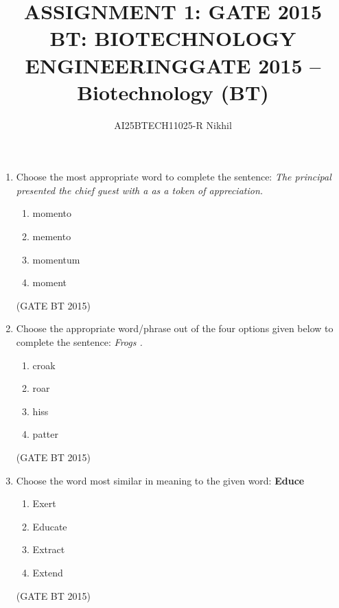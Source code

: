 \documentclass[journal,12pt,onecolumn]{IEEEtran}
\begin{document}
\title{
ASSIGNMENT 1: GATE 2015 \\
BT: BIOTECHNOLOGY ENGINEERING}
\author{AI25BTECH11025-R Nikhil}
\maketitle
\renewcommand{\thefigure}{\theenumi}
\renewcommand{\thetable}{\theenumi}


\title{GATE 2015 -- Biotechnology (BT)}
\date{}
\maketitle



\begin{enumerate}[label=\textbf{Q.\arabic*}]
    \item Choose the most appropriate word to complete the sentence:  
    \textit{The principal presented the chief guest with a \underline{\hspace{2cm}} as a token of appreciation.}
    \begin{multicols}{4}
    \begin{enumerate}
        \item momento  
        \item memento  
        \item momentum  
        \item moment
    \end{enumerate}
    \end{multicols}             \hfill (GATE BT 2015)

    \item Choose the appropriate word/phrase out of the four options given below to complete the sentence:  
    \textit{Frogs \underline{\hspace{2cm}}.}
    \begin{multicols}{4}
    \begin{enumerate}
        \item croak  
        \item roar  
        \item hiss  
        \item patter  
    \end{enumerate}
    \end{multicols}             \hfill (GATE BT 2015)

    \item Choose the word most similar in meaning to the given word:  
    \textbf{Educe}
    \begin{multicols}{4}
    \begin{enumerate}
        \item Exert  
        \item Educate  
        \item Extract  
        \item Extend  
    \end{enumerate}
    \end{multicols}             \hfill (GATE BT 2015)



\end{enumerate}
\end{document}
